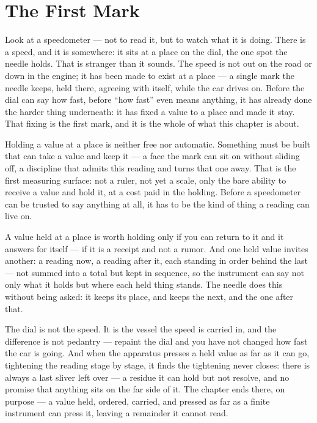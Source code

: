 \chapter{The First Mark}

Look at a speedometer --- not to read it, but to watch what it is doing. There is a speed, and it is somewhere: it sits at a place on the dial, the one spot the needle holds. That is stranger than it sounds. The speed is not out on the road or down in the engine; it has been made to exist at a place --- a single mark the needle keeps, held there, agreeing with itself, while the car drives on. Before the dial can say how fast, before ``how fast'' even means anything, it has already done the harder thing underneath: it has fixed a value to a place and made it stay. That fixing is the first mark, and it is the whole of what this chapter is about.

Holding a value at a place is neither free nor automatic. Something must be built that can take a value and keep it --- a face the mark can sit on without sliding off, a discipline that admits this reading and turns that one away. That is the first measuring surface: not a ruler, not yet a scale, only the bare ability to receive a value and hold it, at a cost paid in the holding. Before a speedometer can be trusted to say anything at all, it has to be the kind of thing a reading can live on.

A value held at a place is worth holding only if you can return to it and it answers for itself --- if it is a receipt and not a rumor. And one held value invites another: a reading now, a reading after it, each standing in order behind the last --- not summed into a total but kept in sequence, so the instrument can say not only what it holds but where each held thing stands. The needle does this without being asked: it keeps its place, and keeps the next, and the one after that.

The dial is not the speed. It is the vessel the speed is carried in, and the difference is not pedantry --- repaint the dial and you have not changed how fast the car is going. And when the apparatus presses a held value as far as it can go, tightening the reading stage by stage, it finds the tightening never closes: there is always a last sliver left over --- a residue it can hold but not resolve, and no promise that anything sits on the far side of it. The chapter ends there, on purpose --- a value held, ordered, carried, and pressed as far as a finite instrument can press it, leaving a remainder it cannot read.

